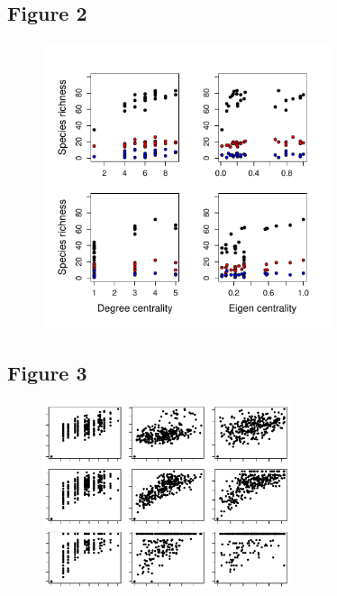 \documentclass[12pt]{article}
\begin{document}
\newpage

\subsection*{Figure 2}

\begin{figure}[ht!]
	\centering\includegraphics[width=0.75\textwidth]{Centrality.pdf}
\end{figure}

\newpage

\subsection*{Figure 3}

\begin{figure}[ht!]
	\centering\includegraphics[width=0.65\textwidth]{BetaGeoDist.pdf}
\end{figure}
\end{document}
